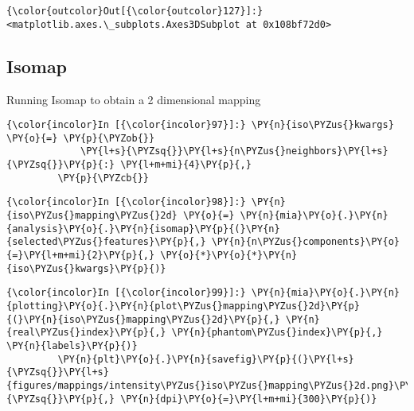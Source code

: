             \begin{Verbatim}[commandchars=\\\{\}]
{\color{outcolor}Out[{\color{outcolor}127}]:} <matplotlib.axes.\_subplots.Axes3DSubplot at 0x108bf72d0>
\end{Verbatim}

    \subsection{Isomap}\label{isomap}

Running Isomap to obtain a 2 dimensional mapping

    \begin{Verbatim}[commandchars=\\\{\}]
{\color{incolor}In [{\color{incolor}97}]:} \PY{n}{iso\PYZus{}kwargs} \PY{o}{=} \PY{p}{\PYZob{}}
             \PY{l+s}{\PYZsq{}}\PY{l+s}{n\PYZus{}neighbors}\PY{l+s}{\PYZsq{}}\PY{p}{:} \PY{l+m+mi}{4}\PY{p}{,}
         \PY{p}{\PYZcb{}}
\end{Verbatim}

    \begin{Verbatim}[commandchars=\\\{\}]
{\color{incolor}In [{\color{incolor}98}]:} \PY{n}{iso\PYZus{}mapping\PYZus{}2d} \PY{o}{=} \PY{n}{mia}\PY{o}{.}\PY{n}{analysis}\PY{o}{.}\PY{n}{isomap}\PY{p}{(}\PY{n}{selected\PYZus{}features}\PY{p}{,} \PY{n}{n\PYZus{}components}\PY{o}{=}\PY{l+m+mi}{2}\PY{p}{,} \PY{o}{*}\PY{o}{*}\PY{n}{iso\PYZus{}kwargs}\PY{p}{)}
\end{Verbatim}

    \begin{Verbatim}[commandchars=\\\{\}]
{\color{incolor}In [{\color{incolor}99}]:} \PY{n}{mia}\PY{o}{.}\PY{n}{plotting}\PY{o}{.}\PY{n}{plot\PYZus{}mapping\PYZus{}2d}\PY{p}{(}\PY{n}{iso\PYZus{}mapping\PYZus{}2d}\PY{p}{,} \PY{n}{real\PYZus{}index}\PY{p}{,} \PY{n}{phantom\PYZus{}index}\PY{p}{,} \PY{n}{labels}\PY{p}{)}
         \PY{n}{plt}\PY{o}{.}\PY{n}{savefig}\PY{p}{(}\PY{l+s}{\PYZsq{}}\PY{l+s}{figures/mappings/intensity\PYZus{}iso\PYZus{}mapping\PYZus{}2d.png}\PY{l+s}{\PYZsq{}}\PY{p}{,} \PY{n}{dpi}\PY{o}{=}\PY{l+m+mi}{300}\PY{p}{)}
\end{Verbatim}

    \begin{center}
    \end{center}
    { \hspace*{\fill} \\}

